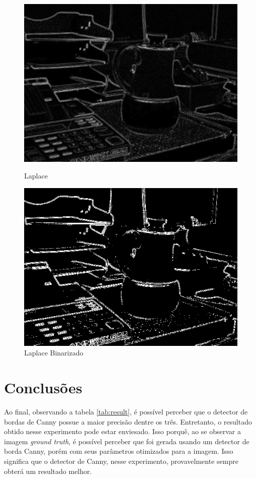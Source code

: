 \documentclass[10pt,twocolumn,letterpaper]{article}
\begin{document}
\begin{figure}[!htb]
  \includegraphics[width=\linewidth]{46-laplacen.jpg}
  \caption{Laplace}\label{fig:laplacen}
\endminipage\hfill
{}
  \includegraphics[width=\linewidth]{46-laplaceb.jpg}
  \caption{Laplace Binarizado}\label{fig:laplaceb}
\endminipage
\end{figure}

\section{Conclusões}
Ao final, observando a tabela \ref{tab:result}, é possível perceber que o detector de bordas de Canny possue a maior precisão dentre os três. Entretanto, o resultado obtido nesse experimento pode estar enviesado. Isso porquê, ao se observar a imagem \emph{ground truth}, é possível perceber que foi gerada usando um detector de borda Canny, porém com seus parâmetros otimizados para a imagem. Isso significa que o detector de Canny, nesse experimento, provavelmente sempre obterá um resultado melhor.
\end{document}
